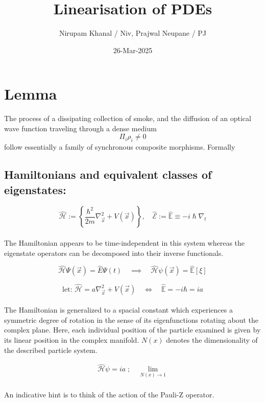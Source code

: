 \documentclass{article}
\begin{document}
\title{Linearisation of PDEs}
\author{Nirupam Khanal / Niv, Prajwal Neupane / PJ}
\date{26-Mar-2025}

\maketitle
\tableofcontents

\section{Lemma}

The process of a dissipating collection of smoke, and the diffusion of an optical wave function traveling through a dense medium 
\[
 \Pi_{i} \rho_{i} \ne 0 
\]
follow essentially a family of synchronous composite morphisms. Formally

\subsection{Hamiltonians and equivalent classes of eigenstates:} 

\[
\hat{\mathcal{H}} := \left\{ \frac{\hbar^2}{2m} \nabla_{\vec x}^2 + V(\vec x) \right\}, \quad \hat{\mathcal{E}} := \hat{\mathbb{E}} \equiv -i\hslash \nabla_{t}
\] \\ 
The Hamiltonian appears to be time-independent in this system whereas the eigenstate operators can be decomposed into their inverse functionals.

\[
\hat{\mathcal{H}} \Psi(\vec x) = \hat{{E}} \Psi(t) \quad \implies \quad \hat{\mathcal{H}} \psi(\vec x) = \hat{\mathbb{E}}[\xi] 
\]

\[
\text{let: } \hat{\mathcal{H}} = a \nabla_{\vec x}^2 + V(\vec x) \quad\iff\quad  \hat{\mathbb{E}} = -i\hbar = ia
\]\\
The Hamiltonian is generalized to a spacial constant which experiences a symmetric degree of rotation in the sense of its eigenfunctions rotating about the complex plane. Here, each individual position of the particle examined is given by its linear position in the complex manifold. $N(x)$ denotes the dimensionality of the described particle system.

\begin{align}
\hat{\mathcal{H}} \psi = ia \;;\quad \lim_{N(x) \to 1}
\end{align} \\ 
An indicative hint is to think of the action of the Pauli-Z operator.
\end{document}
